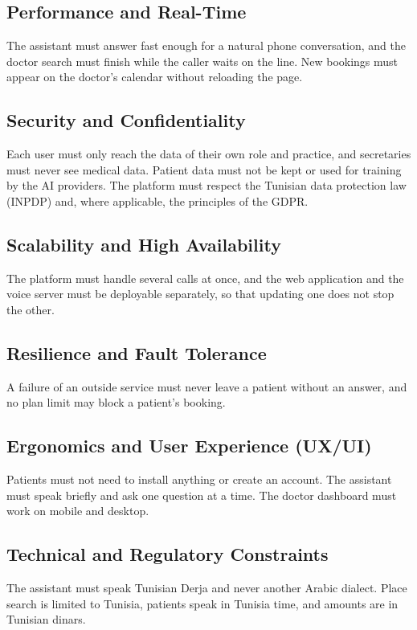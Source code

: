 \subsection{Performance and Real-Time}
The assistant must answer fast enough for a natural phone conversation, and the doctor search must finish while the caller waits on the line. New bookings must appear on the doctor's calendar without reloading the page.

\subsection{Security and Confidentiality}
Each user must only reach the data of their own role and practice, and secretaries must never see medical data. Patient data must not be kept or used for training by the AI providers. The platform must respect the Tunisian data protection law (INPDP) and, where applicable, the principles of the GDPR.

\subsection{Scalability and High Availability}
The platform must handle several calls at once, and the web application and the voice server must be deployable separately, so that updating one does not stop the other.

\subsection{Resilience and Fault Tolerance}
A failure of an outside service must never leave a patient without an answer, and no plan limit may block a patient's booking.

\subsection{Ergonomics and User Experience (UX/UI)}
Patients must not need to install anything or create an account. The assistant must speak briefly and ask one question at a time. The doctor dashboard must work on mobile and desktop.

\subsection{Technical and Regulatory Constraints}
The assistant must speak Tunisian Derja and never another Arabic dialect. Place search is limited to Tunisia, patients speak in Tunisia time, and amounts are in Tunisian dinars.

